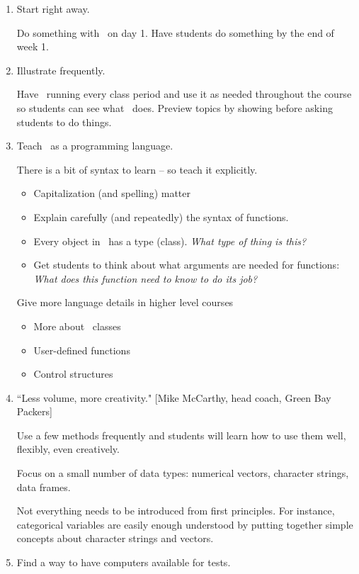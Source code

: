 \begin{enumerate}
\item
Start right away.

Do something with \R\ on day 1.  Have students do something by the end of week 1.


\item Illustrate frequently.

Have \R\ running every class period and use it as needed throughout the course so students
can see what \R\ does.  Preview topics by showing before asking students to do things.

\item
Teach \R\ as a programming language.

There is a bit of syntax to learn -- so teach it explicitly.
\begin{itemize}
\item
Capitalization (and spelling) matter
\item
Explain carefully (and repeatedly) the syntax of functions.
\item
Every object in \R\ has a type (class).  \emph{What type of thing is this?}
\item
Get students to think about what arguments are needed for functions:
\emph{What does this function need to know to do its job?}
\end{itemize}
Give more language details in higher level courses
\begin{itemize}
\item
More about \R\ classes
\item
User-defined functions
\item
Control structures
\end{itemize}

\item ``Less volume, more creativity."  [Mike McCarthy, head coach, Green Bay Packers]

Use a few methods frequently and students will learn how to use them well, flexibly, 
even creatively. 

Focus on a small number of data types: numerical vectors, character
strings, data frames.  

Not everything needs to be introduced from first principles.  For
instance, categorical variables are easily enough understood by
putting together simple concepts about character strings and vectors.

\item
Find a way to have computers available for tests.


\end{enumerate}
